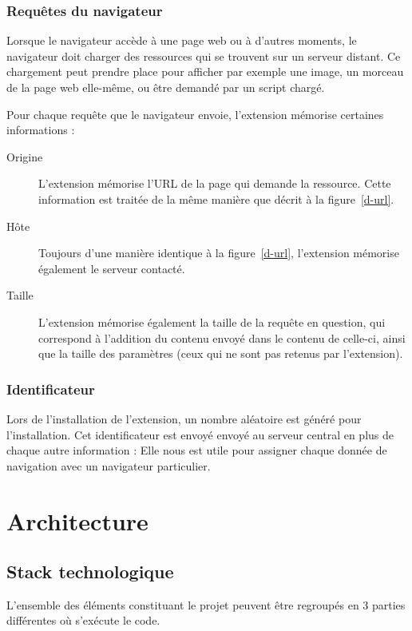 		\subsubsection{Requêtes du navigateur}

			Lorsque le navigateur accède à une page web ou à d'autres moments, le navigateur doit charger des ressources qui se trouvent sur un serveur distant. Ce chargement peut prendre place pour afficher par exemple une image, un morceau de la page web elle-même, ou être demandé par un script chargé.

			Pour chaque requête que le navigateur envoie, l'extension mémorise certaines informations : 
			\begin{description}
				\item[Origine] L'extension mémorise l'URL de la page qui demande la ressource. Cette information est traitée de la même manière que décrit à la figure~\ref{d-url}.
				\item[Hôte] Toujours d'une manière identique à la figure~\ref{d-url}, l'extension mémorise également le serveur contacté.
				\item[Taille] L'extension mémorise également la taille de la requête en question, qui correspond à l'addition du contenu envoyé dans le contenu de celle-ci, ainsi que la taille des paramètres (ceux qui ne sont pas retenus par l'extension).
			\end{description}

		\subsubsection{Identificateur}

			Lors de l'installation de l'extension, un nombre aléatoire est généré pour l'installation. Cet identificateur est envoyé envoyé au serveur central en plus de chaque autre information : Elle nous est utile pour assigner chaque donnée de navigation avec un navigateur particulier.

\section{Architecture}

	\subsection{Stack technologique}

		L'ensemble des éléments constituant le projet peuvent être regroupés en 3 parties différentes où s'exécute le code.

